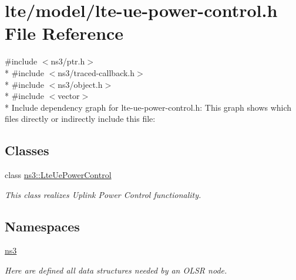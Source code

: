 \hypertarget{lte-ue-power-control_8h}{}\section{lte/model/lte-\/ue-\/power-\/control.h File Reference}
\label{lte-ue-power-control_8h}
{\ttfamily \#include $<$ns3/ptr.\+h$>$}\\*
{\ttfamily \#include $<$ns3/traced-\/callback.\+h$>$}\\*
{\ttfamily \#include $<$ns3/object.\+h$>$}\\*
{\ttfamily \#include $<$vector$>$}\\*
Include dependency graph for lte-\/ue-\/power-\/control.h\+:
This graph shows which files directly or indirectly include this file\+:
\subsection*{Classes}
\begin{DoxyCompactItemize}
\item 
class \hyperlink{classns3_1_1LteUePowerControl}{ns3\+::\+Lte\+Ue\+Power\+Control}
\begin{DoxyCompactList}\small\item\em This class realizes Uplink Power Control functionality. \end{DoxyCompactList}\end{DoxyCompactItemize}
\subsection*{Namespaces}
\begin{DoxyCompactItemize}
\item 
 \hyperlink{namespacens3}{ns3}
\begin{DoxyCompactList}\small\item\em Here are defined all data structures needed by an O\+L\+SR node. \end{DoxyCompactList}\end{DoxyCompactItemize}
